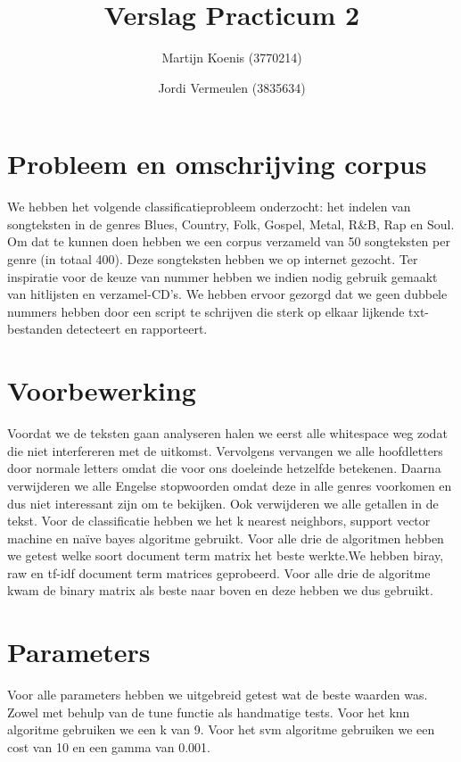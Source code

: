 \documentclass[a4paper,oneside]{article}
\begin{document}
\title{Verslag Practicum 2}
\author{Martijn Koenis (3770214) \and Jordi Vermeulen (3835634)}
\date{}
\maketitle
\tabulinesep=1.2mm

\begin{abstract}
\end{abstract}

\section{Probleem en omschrijving corpus}
We hebben het volgende classificatieprobleem onderzocht: het indelen van songteksten in de genres Blues, Country, Folk, Gospel, Metal, R\&B, Rap en Soul.  Om dat te kunnen doen hebben we een corpus verzameld van 50 songteksten per genre (in totaal 400). Deze songteksten hebben we op internet gezocht. Ter inspiratie voor de keuze van nummer hebben we indien nodig gebruik gemaakt van hitlijsten en verzamel-CD's. We hebben ervoor gezorgd dat we geen dubbele nummers hebben door een script te schrijven die sterk op elkaar lijkende txt-bestanden detecteert en rapporteert.

\section{Voorbewerking}
Voordat we de teksten gaan analyseren halen we eerst alle whitespace weg zodat die niet interfereren met de uitkomst. Vervolgens vervangen we alle hoofdletters door normale letters omdat die voor ons doeleinde hetzelfde betekenen. Daarna verwijderen we alle Engelse stopwoorden omdat deze in alle genres voorkomen en dus niet interessant zijn om te bekijken. Ook verwijderen we alle getallen in de tekst. Voor de classificatie hebben we het k nearest neighbors, support vector machine en na\"ive bayes algoritme gebruikt. Voor alle drie de algoritmen hebben we getest welke soort document term matrix het beste werkte.We hebben biray, raw en tf-idf document term matrices geprobeerd. Voor alle drie de algoritme kwam de binary matrix als beste naar boven en  deze hebben we dus gebruikt.

\section{Parameters}
Voor alle parameters hebben we uitgebreid getest wat de beste waarden was. Zowel met behulp van de tune functie als handmatige tests. Voor het knn algoritme gebruiken we een k van 9. Voor het svm algoritme gebruiken we een cost van 10 en een gamma van 0.001.
\end{document}
